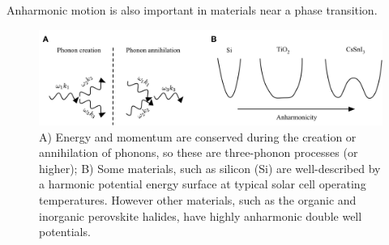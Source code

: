 Anharmonic motion is also important in materials near a phase transition. %









\begin{figure}[h]
\centering
  \includegraphics[resolution=450]{figures/ch3/anharmonicity.png}
  \caption[3-phonon processes and anharmonic potential energy surfaces]{A) Energy and momentum are conserved during the creation or annihilation of phonons, so these are three-phonon processes (or higher); B) Some materials, such as silicon (Si) are well-described by a harmonic potential energy surface at typical solar cell operating temperatures. However other materials, such as the organic and inorganic perovskite halides, have highly anharmonic double well potentials.}
  \label{harmonicregime}
\end{figure}  %



